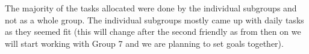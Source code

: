 The majority of the tasks allocated were done by the individual subgroups and not as a whole group. The individual subgroups mostly came up with daily tasks as they seemed fit (this will change after the second friendly as from then on we will start working with Group 7 and we are planning to set goals together). 